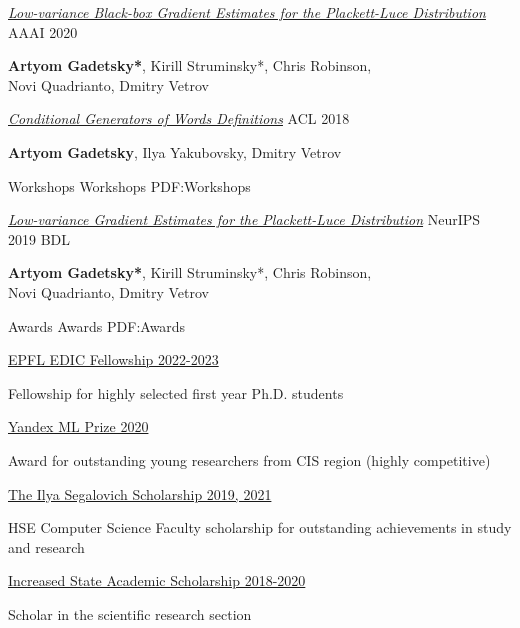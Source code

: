 \documentclass[letterpaper,MMMyyyy,nonstopmode]{simpleresumecv}
\begin{document}
\begin{Body}
\Entry
\href{https://ojs.aaai.org/index.php/AAAI/article/view/6572}{\textit{Low-variance Black-box Gradient Estimates for the Plackett-Luce Distribution}} \hfill AAAI 2020
\begin{Detail}
\textbf{Artyom Gadetsky*}, Kirill Struminsky*, Chris Robinson, \\ Novi Quadrianto, Dmitry Vetrov
\end{Detail}
\Gap

\Entry
\href{https://aclanthology.org/P18-2043/}{\textit{Conditional Generators of Words Definitions}} \hfill ACL 2018
\begin{Detail}
\textbf{Artyom Gadetsky}, Ilya Yakubovsky, Dmitry Vetrov
\end{Detail}
\BigGap

\SubSection
{Workshops}
{Workshops}
{PDF:Workshops}
\Gap

\Entry
\href{http://bayesiandeeplearning.org/2019/}{\textit{Low-variance Gradient Estimates for the Plackett-Luce Distribution}} \hfill NeurIPS 2019 BDL
\begin{Detail}
\textbf{Artyom Gadetsky*}, Kirill Struminsky*, Chris Robinson, \\ Novi Quadrianto, Dmitry Vetrov
\end{Detail}

\Section
{Awards}
{Awards}
{PDF:Awards}

\Entry
\href{https://www.epfl.ch/education/phd/edic-computer-and-communication-sciences/edic-for-phd-students/}{EPFL EDIC Fellowship 2022-2023}
\begin{Detail}
Fellowship for highly selected first year Ph.D. students
\end{Detail}
\Gap

\Entry
\href{https://yandex.com/scholarships/}{Yandex ML Prize 2020}
\begin{Detail}
Award for outstanding young researchers from CIS region (highly competitive)
\end{Detail}
\Gap

\Entry
\href{https://cs.hse.ru/en/stipend/}{The Ilya Segalovich Scholarship 2019, 2021}
\begin{Detail}
HSE Computer Science Faculty scholarship for outstanding achievements in study and research
\end{Detail}
\Gap

\Entry
\href{https://www.hse.ru/en/scholarships/academic_raised_demo}{Increased State Academic Scholarship 2018-2020}
\begin{Detail}
Scholar in the scientific research section
\end{Detail}
\Gap


\end{Body}
\end{document}
